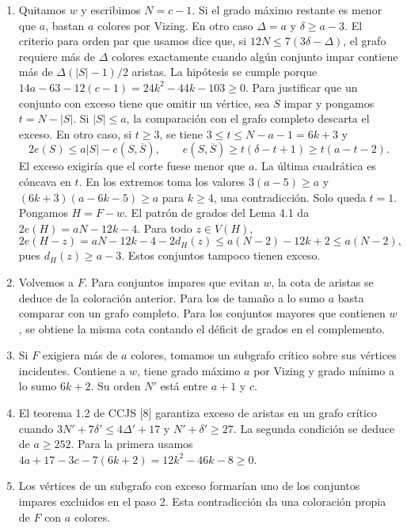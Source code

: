 \documentclass[spanish,11pt,a4paper]{article}
\providecommand{\tightlist}{\setlength{\itemsep}{0pt}\setlength{\parskip}{0pt}}
\begin{document}
\begin{enumerate}
\def\labelenumi{\arabic{enumi}.}
\tightlist
\item
  Quitamos \(w\) y escribimos \(N=c-1\). Si el grado máximo restante es menor que \(a\), bastan \(a\) colores por Vizing. En otro caso \(\Delta=a\) y \(\delta\ge a-3\). El criterio para orden par que usamos dice que, si \(12N\le7(3\delta-\Delta)\), el grafo requiere más de \(\Delta\) colores exactamente cuando algún conjunto impar contiene más de \(\Delta(|S|-1)/2\) aristas. La hipótesis se cumple porque \(14a-63-12(c-1)=24k^2-44k-103\ge0\). Para justificar que un conjunto con exceso tiene que omitir un vértice, sea \(S\) impar y pongamos \(t=N-|S|\). Si \(|S|\le a\), la comparación con el grafo completo descarta el exceso. En otro caso, si \(t\ge3\), se tiene \(3\le t\le N-a-1=6k+3\) y \[2e(S)\le a|S|-e(S,\overline S),\qquad e(S,\overline S)\ge t(\delta-t+1)\ge t(a-t-2).\] El exceso exigiría que el corte fuese menor que \(a\). La última cuadrática es cóncava en \(t\). En los extremos toma los valores \(3(a-5)\ge a\) y \((6k+3)(a-6k-5)\ge a\) para \(k\ge4\), una contradicción. Solo queda \(t=1\). Pongamos \(H=F-w\). El patrón de grados del Lema 4.1 da \(2e(H)=aN-12k-4\). Para todo \(z\in V(H)\), \[2e(H-z)=aN-12k-4-2d_H(z)\le a(N-2)-12k+2\le a(N-2),\] pues \(d_H(z)\ge a-3\). Estos conjuntos tampoco tienen exceso.
\item
  Volvemos a \(F\). Para conjuntos impares que evitan \(w\), la cota de aristas se deduce de la coloración anterior. Para los de tamaño a lo sumo \(a\) basta comparar con un grafo completo. Para los conjuntos mayores que contienen \(w\), se obtiene la misma cota contando el déficit de grados en el complemento.
\item
  Si \(F\) exigiera más de \(a\) colores, tomamos un subgrafo crítico sobre sus vértices incidentes. Contiene a \(w\), tiene grado máximo \(a\) por Vizing y grado mínimo a lo sumo \(6k+2\). Su orden \(N'\) está entre \(a+1\) y \(c\).
\item
  El teorema 1.2 de CCJS {[}8{]} garantiza exceso de aristas en un grafo crítico cuando \(3N'+7\delta'\le4\Delta'+17\) y \(N'+\delta'\ge27\). La segunda condición se deduce de \(a\ge252\). Para la primera usamos \(4a+17-3c-7(6k+2)=12k^2-46k-8\ge0\).
\item
  Los vértices de un subgrafo con exceso formarían uno de los conjuntos impares excluidos en el paso 2. Esta contradicción da una coloración propia de \(F\) con \(a\) colores.
\end{enumerate}
\end{document}

